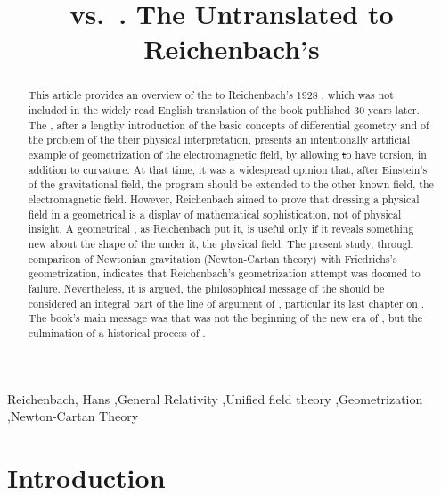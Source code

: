 \documentclass[submitted]{article}
\title{\scare{Geometrization of Physics} vs.\ \scare{Physicalization of Geometry}. The Untranslated \Ap to Reichenbach's \PRZL}
\newcommand{\PRZL}{\citetitle{Reichenbach1928}\xspace}
\begin{document}
\maketitle


\begin{abstract}
This article provides an overview of the \Ap to Reichenbach's 1928 \PRZL, which was not included in the widely read English translation of the book published 30 years later. The \Ap, after a lengthy introduction of the basic concepts of differential geometry and of the problem of the their physical interpretation, presents an intentionally artificial example of geometrization of the electromagnetic field, by allowing \st to have torsion, in addition to curvature. At that time, it was a widespread opinion that, after Einstein's  of the gravitational field, the  program should be extended to the other known field, the electromagnetic field. However, Reichenbach aimed to prove that dressing a physical field in a geometrical  is a display of mathematical sophistication, not of physical insight. A geometrical , as Reichenbach put it, is useful only if it reveals something new about the shape of the  under it, the physical field. The present study, through comparison of Newtonian gravitation (Newton-Cartan theory) with Friedrichs's geometrization, indicates that Reichenbach's geometrization attempt was doomed to failure. Nevertheless, it is argued, the philosophical message of the \Ap should be considered an integral part of the line of argument of \PRZL, particular its last chapter on \gr. The book's main message was that \gr was not the beginning of the new era of , but the culmination of a historical process of .
\end{abstract}



\begin{keywords}
Reichenbach, Hans \sep General Relativity \sep Unified field theory \sep Geometrization 
\sep Newton-Cartan Theory
\end{keywords}


\section*{Introduction}
\end{document}
